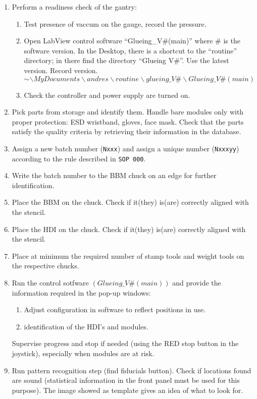 \documentclass[12pt]{unlsilabsop}
\begin{document}
\begin{enumerate}
    \item Perform a readiness check of the gantry:
    \begin{enumerate}
	\item Test presence of vaccum on the gauge, record the pressure.
	\item Open LabView control software ``Glueing\_V\#(main)''  where $\#$ is the software version. In the Desktop, there is a shortcut to the ``routine'' directory; in there find the directory ``Glueing V\#''. Use the latest version. Record version.$$ \sim\backslash MyDocuments\backslash andres\backslash routine\backslash glueing\_V\#\backslash Glueing\_V\#(main)$$
        \item Check the controller and power supply are turned on.
    \end{enumerate}
    \item Pick parts from storage and identify them. Handle bare modules only with proper protection: ESD wristband, gloves, face mask. Check that the parts satisfy the quality criteria by retrieving their information in the database.
    \item Assign a new batch number (\texttt{Nxxx}) and assign a unique number (\texttt{Nxxxyy}) according to the rule described in \texttt{SOP~000}.
    \item Write the batch number to the BBM chuck on an edge for further identification.
    \item Place the BBM on the chuck. Check if it(they) is(are) correctly aligned with the stencil.
    \item Place the HDI on the chuck. Check if it(they) is(are) correctly aligned with the stencil.
    \item Place at minimum the required number of stamp tools and weight tools on the respective chucks.
    \item Run the control sotfware $(Glueing\_V\#(main))$ and provide the information required in the pop-up windows:
      \begin{enumerate}
        \item Adjust configuration in software to reflect positions in use.
        \item identification of the HDI's and modules.
      \end{enumerate}
      Supervise progress and stop if needed (using the RED stop button in the joystick), especially when modules are at risk.
    \item Run pattern recognition step (find fiducials button). Check if locations found are sound (statistical information in the front panel must be used for this purpose). The image showed as template gives an idea of what to look for. 

\end{enumerate}
\end{document}
